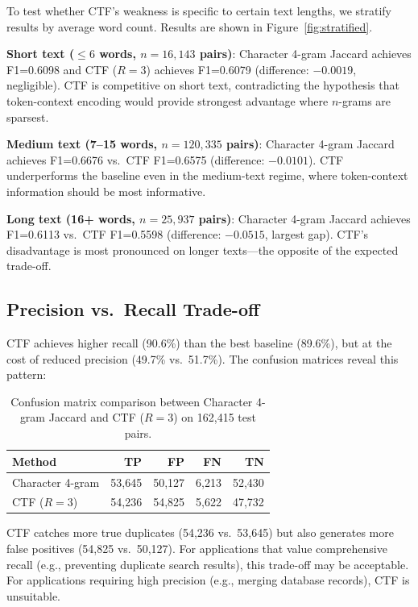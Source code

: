 \documentclass[11pt,letterpaper]{article}
\begin{document}
To test whether CTF's weakness is specific to certain text lengths, we stratify results by average word count. Results are shown in Figure~\ref{fig:stratified}.

\textbf{Short text (${\leq}6$ words, $n=16{,}143$ pairs)}:
Character 4-gram Jaccard achieves F1=0.6098 and CTF ($R=3$) achieves F1=0.6079 (difference: $-0.0019$, negligible). CTF is competitive on short text, contradicting the hypothesis that token-context encoding would provide strongest advantage where $n$-grams are sparsest.

\textbf{Medium text (7--15 words, $n=120{,}335$ pairs)}:
Character 4-gram Jaccard achieves F1=0.6676 vs.\ CTF F1=0.6575 (difference: $-0.0101$). CTF underperforms the baseline even in the medium-text regime, where token-context information should be most informative.

\textbf{Long text (16+ words, $n=25{,}937$ pairs)}:
Character 4-gram Jaccard achieves F1=0.6113 vs.\ CTF F1=0.5598 (difference: $-0.0515$, largest gap). CTF's disadvantage is most pronounced on longer texts---the opposite of the expected trade-off.

\subsection{Precision vs.\ Recall Trade-off}

CTF achieves higher recall (90.6\%) than the best baseline (89.6\%), but at the cost of reduced precision (49.7\% vs.\ 51.7\%). The confusion matrices reveal this pattern:

\begin{table}[!htbp]
  \centering
  \caption{Confusion matrix comparison between Character 4-gram Jaccard and CTF ($R=3$) on 162,415 test pairs.}
  \label{tab:confusion}
  \begin{tabular}{lrrrr}
    \toprule
    Method & TP & FP & FN & TN \\
    \midrule
    Character 4-gram & 53,645 & 50,127 & 6,213 & 52,430 \\
    CTF ($R=3$)      & 54,236 & 54,825 & 5,622 & 47,732 \\
    \bottomrule
  \end{tabular}
\end{table}

CTF catches more true duplicates (54,236 vs.\ 53,645) but also generates more false positives (54,825 vs.\ 50,127). For applications that value comprehensive recall (e.g., preventing duplicate search results), this trade-off may be acceptable. For applications requiring high precision (e.g., merging database records), CTF is unsuitable.
\end{document}
